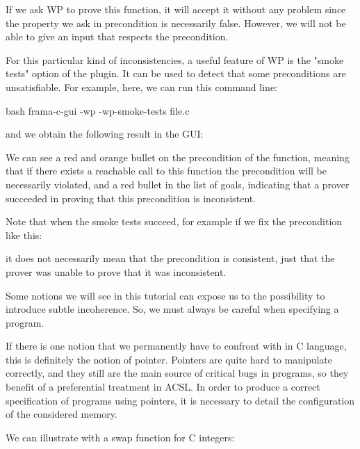 

If we ask WP to prove this function, it will accept it without any problem
since the property we ask in precondition is necessarily false.
However, we will not be able to give an input that respects the
precondition.


For this particular kind of inconsistencies, a useful feature of WP is
the "smoke tests" option of the plugin. It can be used to detect that
some preconditions are unsatisfiable. For example, here, we can run this
command line:


\begin{CodeBlock}{bash}
  frama-c-gui -wp -wp-smoke-tests file.c
\end{CodeBlock}


and we obtain the following result in the GUI:




We can see a red and orange bullet on the precondition of the function,
meaning that if there exists a reachable call to this function the
precondition will be necessarily violated, and a red bullet in the
list of goals, indicating that a prover succeeded in proving that this
precondition is inconsistent.


Note that when the smoke tests succeed, for example if we fix the
precondition like this:




it does not necessarily mean that the precondition is consistent, just
that the prover was unable to prove that it was inconsistent.


Some notions we will see in this tutorial can expose us to the
possibility to introduce subtle incoherence. So, we must always be
careful when specifying a program.




If there is one notion that we permanently have to confront with in C
language, this is definitely the notion of pointer. Pointers are quite
hard to manipulate correctly, and they still are the main source of
critical bugs in programs, so they benefit of a preferential treatment
in ACSL. In order to produce a correct specification of programs using
pointers, it is necessary to detail the configuration of the considered
memory.

We can illustrate with a swap function for C integers:







